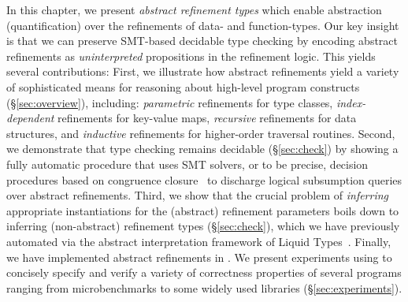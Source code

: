 In this chapter, we present \emph{abstract refinement types} 
which enable abstraction (quantification) over the refinements 
of data- and function-types. Our key insight is that we can 
preserve SMT-based decidable type checking by encoding 
abstract refinements as \emph{uninterpreted} propositions 
in the refinement logic. 
This yields several contributions:
%
First, we illustrate how abstract refinements yield a variety 
of sophisticated means for reasoning about high-level program 
constructs (\S \ref{sec:overview}), including:
\emph{parametric} refinements for type classes,
\emph{index-dependent} refinements for key-value maps,
\emph{recursive} refinements for data structures, and
\emph{inductive} refinements for higher-order traversal routines.
%
Second, we demonstrate that type checking remains 
decidable (\S \ref{sec:check}) by showing a fully automatic
procedure that uses SMT solvers, or to be precise, 
decision procedures based on congruence closure~\cite{Nelson81}
to discharge logical subsumption queries over abstract refinements.
%
Third, we show that the crucial problem of \emph{inferring}
appropriate instantiations for the (abstract) refinement 
parameters boils down to inferring (non-abstract) refinement
types (\S \ref{sec:check}), which we have previously automated 
via the abstract interpretation framework of Liquid Types~\cite{LiquidPLDI08}. 
%
Finally, we have implemented abstract refinements in \toolname.
We present experiments using \toolname to concisely specify and 
verify a variety of correctness properties of several 
programs ranging from microbenchmarks to some widely 
used libraries (\S \ref{sec:experiments}).
